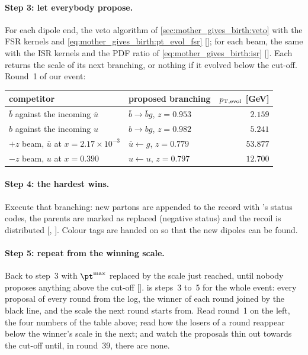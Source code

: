 \paragraph{Step 3: let everybody propose.} For each dipole end, the veto
algorithm of \cref{sec:mother_gives_birth:veto} with the FSR kernels and
\cref{eq:mother_gives_birth:pt_evol_fsr} []; for each
beam, the same with the ISR kernels and the PDF ratio of
\cref{eq:mother_gives_birth:isr} []. Each returns the
scale of its next branching, or nothing if it evolved below the cut-off.
Round~1 of our event:
\begin{center}\small
\begin{tabular}{llr}\toprule
competitor & proposed branching & $p_{\mathrm{T,evol}}$ [GeV] \\ \midrule
$\bar b$ against the incoming $\bar u$ & $\bar b\to\bar b g$, $z=0.953$ & $2.159$ \\
$b$ against the incoming $u$ & $b\to bg$, $z=0.982$ & $5.241$ \\
$+z$ beam, $\bar u$ at $x=2.17\times10^{-3}$ & $\bar u\leftarrow g$, $z=0.779$ & $\mathbf{53.877}$ \\
$-z$ beam, $u$ at $x=0.390$ & $u\leftarrow u$, $z=0.797$ & $12.700$ \\
\bottomrule
\end{tabular}
\end{center}

\paragraph{Step 4: the hardest wins.} Execute that branching: new partons
are appended to the record with \PYTHIA's status codes, the parents are
marked as replaced (negative status) and the recoil is distributed
[, ]. Colour tags are handed on so that
the new dipoles can be found.

\paragraph{Step 5: repeat from the winning scale.} Back to step~3 with
$\pt^{\max}$ replaced by the scale just reached, until nobody proposes
anything above the cut-off [].
 is steps~3 to~5 for the
whole event: every proposal of every round from the  log, the
winner of each round joined by the black line, and the scale the next
round starts from. Read round~1 on the left, the four numbers of the table
above; read how the losers of a round reappear below the winner's scale in
the next; and watch the proposals thin out towards the cut-off until, in
round~39, there are none.

